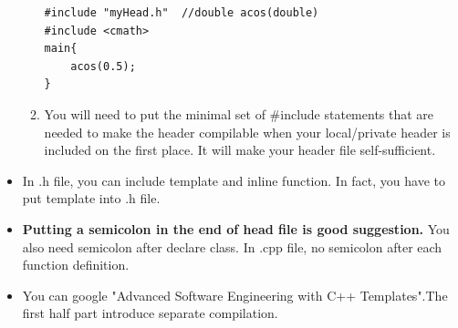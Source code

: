 \documentclass[a4paper,11pt,twoside]{book}
\begin{document}
\begin{itemize}
\begin{enumerate}
\begin{lstlisting}[numbers=none]
#include "myHead.h"  //double acos(double)
#include <cmath>
main{
	acos(0.5);
}
\end{lstlisting}
		
		\item You will need to put the minimal set of \#include statements that are needed to make the header compilable when your local/private header is included on the first place.  It will make your header file self-sufficient.
	\end{enumerate}
	
	\item In .h file, you can include template and inline function.  In fact, you have to put template into .h file. 
	
	\item \textbf{Putting a semicolon in the end of head file is good suggestion.} You also need semicolon after declare class. In .cpp file, no semicolon after each function definition.
	
	\item You can google "Advanced Software Engineering with C++ Templates".The first half part introduce separate compilation.
\end{itemize}
\end{document}
